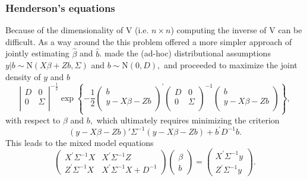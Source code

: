 \documentclass[12pt, a4paper]{report}
\theoremstyle{plain}
\theoremstyle{definition}
\theoremstyle{remark}
\begin{document}
\subsubsection{Henderson's equations}
Because of the dimensionality of V (i.e. $n \times n$) computing the inverse of V can be difficult. As a way around the this problem \citet{Henderson53, Henderson59,Henderson63,Henderson73,Henderson84a} offered a more simpler approach of jointly estimating $\hat{\beta}$ and $\hat{b}$.
\cite{Henderson:1950} made the (ad-hoc) distributional assumptions $y|b \sim \mathrm{N} (X \beta + Zb, \Sigma)$ and $b \sim \mathrm{N}(0,D),$ and proceeded to maximize the joint density of $y$ and $b$
\begin{equation}
\left|
\begin{array}{cc}
D & 0 \\
0 & \Sigma \\
\end{array}
  \right|^{-\frac{1}{2}}
\exp
\left\{ -\frac{1}{2}
\left(
\begin{array}{c}
                b \\
                y - X \beta -Zb \\
              \end{array}
            \right)^\prime
\left( \begin{array}{cc}
D & 0 \\
0 & \Sigma \\
\end{array}\right)^{-1}
\left(
\begin{array}{c}
                b \\
                y - X \beta -Zb \\
              \end{array}
            \right)
\right\},
\label{u&beta:JointDensity}
\end{equation}
with respect to $\beta$ and $b,$ which ultimately requires minimizing the criterion
\begin{equation}
(y - X \beta -Zb)'\Sigma^{-1}(y - X \beta -Zb) + b^\prime D^{-1}b.
\label{Henderson:Criterion}
\end{equation}
This leads to the mixed model equations
\begin{equation}
\left(\begin{array}{cc}
  X^\prime\Sigma^{-1}X & X^\prime\Sigma^{-1}Z
  \\
  Z^\prime\Sigma^{-1}X & X^\prime\Sigma^{-1}X + D^{-1}
  \end{array}\right)
\left(\begin{array}{c}
    \beta \\
  b
  \end{array}\right)
  =
\left(\begin{array}{c}
  X^\prime\Sigma^{-1}y \\
  Z^\prime\Sigma^{-1}y
  \end{array}\right).
\label{Henderson:Equations}
\end{equation}
\end{document}
